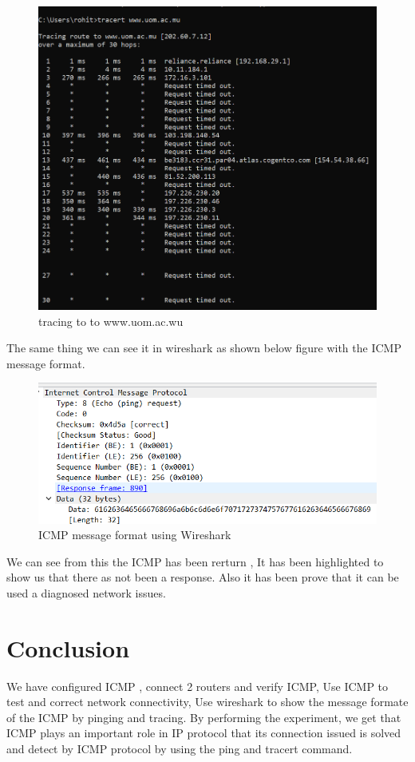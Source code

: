 \documentclass[12pt,a4paper]{article}
\begin{document}
\begin{figure}[h]
 		\centering
				\includegraphics[scale=0.27]{6.9.png}	


			\caption{tracing to to www.uom.ac.wu}
			\label{fig:AP}
	\end{figure}
\pagebreak
The same thing we can see it in wireshark as shown below figure with the ICMP message format.

\begin{figure}[h]
 		\centering
				\includegraphics[scale=0.7]{6.5.png}	


			\caption{ICMP message format using Wireshark}
			\label{fig:AP}
	\end{figure}

We can see from this the ICMP has been rerturn , It has been  highlighted to show us that there as not been a response. Also it  has been prove that it can be used a diagnosed network issues.
\pagebreak
\section{\Large{Conclusion}}
We have configured ICMP , connect 2 routers and verify ICMP, Use ICMP to test and correct network connectivity, Use wireshark to show the message formate of the ICMP by pinging and tracing. By performing the experiment, we get that ICMP plays an important role in IP protocol that its connection issued is solved and detect by ICMP protocol by using the ping and tracert command.
\pagebreak
\end{document}
